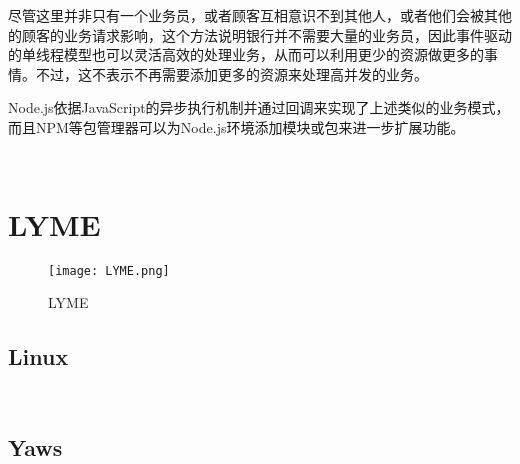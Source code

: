 尽管这里并非只有一个业务员，或者顾客互相意识不到其他人，或者他们会被其他的顾客的业务请求影响，这个方法说明银行并不需要大量的业务员，因此事件驱动的单线程模型也可以灵活高效的处理业务，从而可以利用更少的资源做更多的事情。不过，这不表示不再需要添加更多的资源来处理高并发的业务。

Node.js依据JavaScript的异步执行机制并通过回调来实现了上述类似的业务模式，而且NPM等包管理器可以为Node.js环境添加模块或包来进一步扩展功能。





\begin{lstlisting}[language=bash]

\end{lstlisting}




\begin{lstlisting}[language=bash]

\end{lstlisting}


\chapter{LYME}


\begin{figure}[htbp]
\centering
\texttt{[image: LYME.png]}
\caption{LYME}
\end{figure}




\section{Linux}


\begin{lstlisting}[language=bash]

\end{lstlisting}




\begin{lstlisting}[language=bash]

\end{lstlisting}


\section{Yaws}


\begin{lstlisting}[language=bash]

\end{lstlisting}




